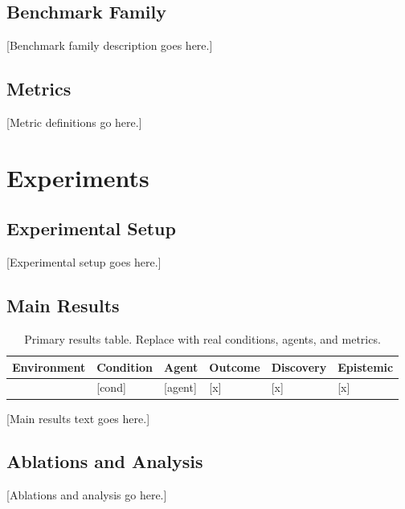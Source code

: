 \documentclass{article}
\begin{document}
\subsection{Benchmark Family}
[Benchmark family description goes here.]

\subsection{Metrics}
[Metric definitions go here.]

\section{Experiments}

\subsection{Experimental Setup}
[Experimental setup goes here.]

\subsection{Main Results}

\begin{table}[t]
 \caption{Primary results table. Replace with real conditions, agents, and metrics.}
 \label{tab:results}
 \centering
 \begin{tabular}{llllll}
 \toprule
 Environment & Condition & Agent & Outcome & Discovery & Epistemic \\
 \midrule
 [env] & [cond] & [agent] & [x] & [x] & [x] \\
 \bottomrule
 \end{tabular}
\end{table}

[Main results text goes here.]

\subsection{Ablations and Analysis}
[Ablations and analysis go here.]
\end{document}

